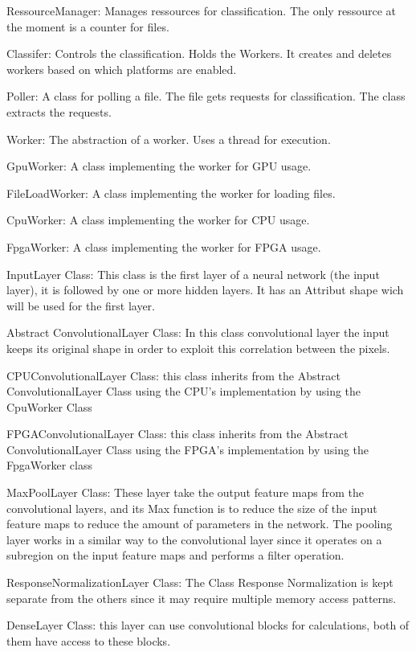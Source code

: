 \documentclass[parskip=full]{scrartcl}
\begin{document}
RessourceManager: Manages ressources for classification. The only ressource at the moment is a counter for files.

Classifer: Controls the classification. Holds the Workers. It creates and deletes workers based on which platforms are enabled.

Poller: A class for polling a file. The file gets requests for classification. The class extracts the requests.

Worker: The abstraction of a worker. Uses a thread for execution.

GpuWorker: A class implementing the worker for GPU usage.

FileLoadWorker: A class implementing the worker for loading files.

CpuWorker: A class implementing the worker for CPU usage.

FpgaWorker: A class implementing the worker for FPGA usage.








InputLayer Class: This class is the first layer of a neural network (the input layer), it is followed by one or more hidden layers.  It has an Attribut shape wich will be used for the first layer.

Abstract ConvolutionalLayer Class: In this class convolutional layer the input keeps its original shape in order to exploit this correlation between the pixels. 

CPUConvolutionalLayer Class: this class inherits from the Abstract ConvolutionalLayer Class using the CPU’s implementation by using the CpuWorker Class

FPGAConvolutionalLayer Class: this class inherits from the Abstract ConvolutionalLayer Class using the FPGA’s implementation by using the FpgaWorker class

MaxPoolLayer Class: These layer take the output feature maps from the convolutional layers, and its Max function is to reduce the size of the input feature maps to reduce the amount of parameters in the network.
The pooling layer works in a similar way to the convolutional layer since it operates on a subregion on the input feature maps and performs a filter operation.

ResponseNormalizationLayer Class: The Class Response Normalization is kept separate from the others since it may require multiple memory access patterns.

DenseLayer Class:  this layer can use convolutional blocks for calculations, both of them have access to these blocks.
\end{document}
